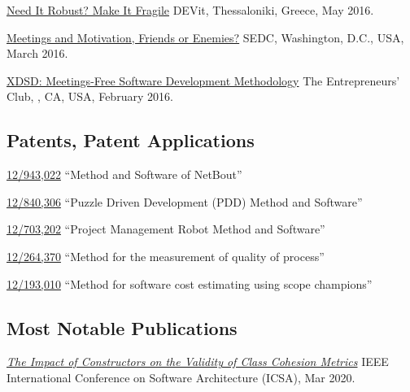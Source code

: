 \documentclass{yb}
\begin{document}
    \begin{samepage}
        \href{https://www.youtube.com/watch?v=nCGBgI1MNwE}{Need It Robust? Make It Fragile}\newline
        DEVit, Thessaloniki, Greece, May 2016.
    \end{samepage}

    \begin{samepage}
        \href{https://www.youtube.com/watch?v=LB_YLWhGrco}{Meetings and Motivation, Friends or Enemies?}\newline
        SEDC, Washington, D.C., USA, March 2016.
    \end{samepage}

    \begin{samepage}
        \href{https://www.youtube.com/watch?v=qRZYJGYdrwk}{XDSD: Meetings-Free Software Development Methodology}\newline
        The Entrepreneurs' Club, , CA, USA, February 2016.
    \end{samepage}

    \subsection*{Patents, Patent Applications}

    \href{https://patents.google.com/patent/US20120117164}{12/943,022}
    ``Method and Software of NetBout''

    \href{https://patents.google.com/patent/US20120023476}{12/840,306}
    ``Puzzle Driven Development (PDD) Method and Software''

    \href{https://patents.google.com/patent/US20110196798}{12/703,202}
    ``Project Management Robot Method and Software''

    \href{https://patents.google.com/patent/US20100114638}{12/264,370}
    ``Method for the measurement of quality of process''

    \href{https://patents.google.com/patent/US20100042968}{12/193,010}
    ``Method for software cost estimating using scope champions''

    \subsection*{Most Notable Publications}

    \begin{samepage}
        \emph{\href{https://www.yegor256.com/pdf/2020/icsa20.pdf}{The Impact of Constructors on the Validity of Class Cohesion Metrics}}\newline
        IEEE International Conference on Software Architecture (ICSA), Mar 2020.
    \end{samepage}
\end{document}
